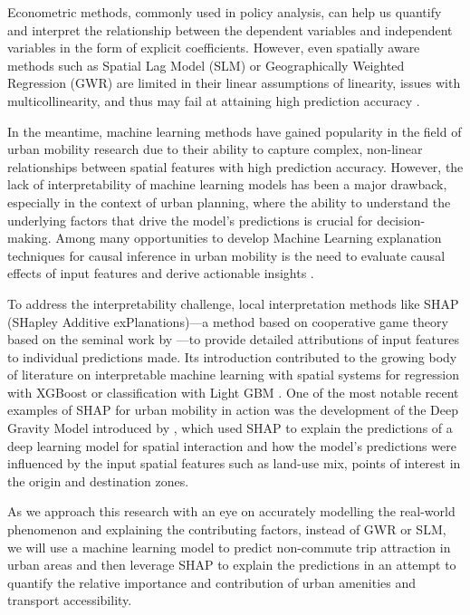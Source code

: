 Econometric methods, commonly used in policy analysis, can help us quantify and interpret the relationship between the dependent variables and independent variables in the form of explicit coefficients. However, even spatially aware methods such as Spatial Lag Model (SLM) or Geographically Weighted Regression (GWR) are limited in their linear assumptions of linearity, issues with multicollinearity, and thus may fail at attaining high prediction accuracy \citep{wheelerMulticollinearityCorrelationLocal2005}.

In the meantime, machine learning methods have gained popularity in the field of urban mobility research due to their ability to capture complex, non-linear relationships between spatial features with high prediction accuracy. However, the lack of interpretability of machine learning models has been a major drawback, especially in the context of urban planning, where the ability to understand the underlying factors that drive the model's predictions is crucial for decision-making. Among many opportunities to develop Machine Learning explanation techniques for causal inference in urban mobility is the need to evaluate causal effects of input features and derive actionable insights \citep{xinVisionPaperCausal2022}.

To address the interpretability challenge, local interpretation methods like SHAP (SHapley Additive exPlanations)---a method based on cooperative game theory based on the seminal work by \cite{lundbergUnifiedApproachInterpreting2017a}---to provide detailed attributions of input features to individual predictions made. Its introduction contributed to the growing body of literature on interpretable machine learning with spatial systems for regression with XGBoost \citep{liExtractingSpatialEffects2022} or classification with Light GBM \citep{louhichiShapleyValuesExplaining2023}. One of the most notable recent examples of SHAP for urban mobility in action was the development of the Deep Gravity Model introduced by \cite{siminiDeepGravityModel2021}, which used SHAP to explain the predictions of a deep learning model for spatial interaction and how the model's predictions were influenced by the input spatial features such as land-use mix, points of interest in the origin and destination zones. 

As we approach this research with an eye on accurately modelling the real-world phenomenon and explaining the contributing factors, instead of GWR or SLM, we will use a machine learning model to predict non-commute trip attraction in urban areas and then leverage SHAP to explain the predictions in an attempt to quantify the relative importance and contribution of urban amenities and transport accessibility.

